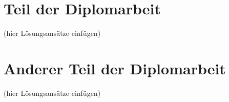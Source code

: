 \section{Teil der Diplomarbeit}
(hier L\"osungsans\"atze einf\"ugen)
\section{Anderer Teil der Diplomarbeit}
(hier L\"osungsans\"atze einf\"ugen)